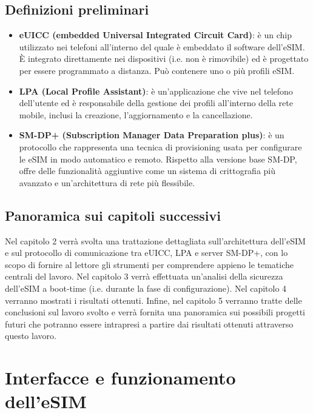 \documentclass[10pt, oneside]{book}
\begin{document}
\section{Definizioni preliminari}
\begin{itemize}
\item \textbf{eUICC (embedded Universal Integrated Circuit Card)}: è un chip utilizzato nei telefoni all'interno del quale è embeddato il software dell'eSIM. È integrato direttamente nei dispositivi (i.e. non è rimovibile) ed è progettato per essere programmato a distanza. Può contenere uno o più profili eSIM.
\item \textbf{LPA (Local Profile Assistant)}: è un'applicazione che vive nel telefono dell'utente ed è responsabile della gestione dei profili all'interno della rete mobile, inclusi la creazione, l'aggiornamento e la cancellazione.
\item \textbf{SM-DP+ (Subscription Manager Data Preparation plus)}: è un protocollo che rappresenta una tecnica di provisioning usata per configurare le eSIM in modo automatico e remoto. Rispetto alla versione base SM-DP, offre delle funzionalità aggiuntive come un sistema di crittografia più avanzato e un'architettura di rete più flessibile.
\end{itemize}

\section{Panoramica sui capitoli successivi}
Nel capitolo 2 verrà svolta una trattazione dettagliata sull'architettura dell'eSIM e sul protocollo di comunicazione tra eUICC, LPA e server SM-DP+, con lo scopo di fornire al lettore gli strumenti per comprendere appieno le tematiche centrali del lavoro. Nel capitolo 3 verrà effettuata un'analisi della sicurezza dell'eSIM a boot-time (i.e. durante la fase di configurazione). Nel capitolo 4 verranno mostrati i risultati ottenuti. Infine, nel capitolo 5 verranno tratte delle conclusioni sul lavoro svolto e verrà fornita una panoramica sui possibili progetti futuri che potranno essere intrapresi a partire dai risultati ottenuti attraverso questo lavoro.

\chapter{Interfacce e funzionamento dell'eSIM}
\end{document}
